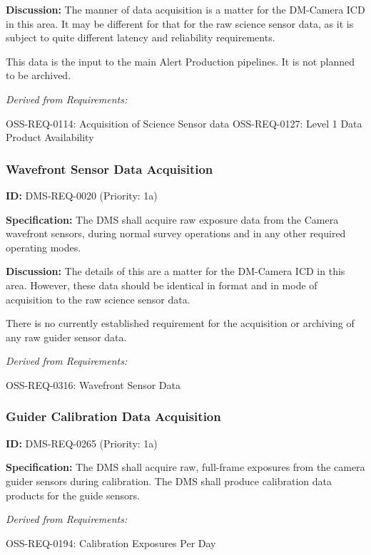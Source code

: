 \documentclass[SE,toc,lsstdraft]{lsstdoc}
\begin{document}
\textbf{Discussion:} The manner of data acquisition is a matter for the DM-Camera ICD in this area.  It may be different for that for the raw science sensor data, as it is subject to quite different latency and reliability requirements.

This data is the input to the main Alert Production pipelines.  It is not planned to be archived.

\emph{Derived from Requirements:}

OSS-REQ-0114:
Acquisition of Science Sensor data \newline
OSS-REQ-0127:
Level 1 Data Product Availability \newline

\subsubsection{Wavefront Sensor Data Acquisition}

\label{DMS-REQ-0020}
\textbf{ID:} DMS-REQ-0020 (Priority: 1a)

\textbf{Specification:} The DMS shall acquire raw exposure data from the Camera wavefront sensors, during normal survey operations and in any other required operating modes.

\textbf{Discussion:} The details of this are a matter for the DM-Camera ICD in this area. However, these data should be identical in format and in mode of acquisition to the raw science sensor data.

There is no currently established requirement for the acquisition or archiving of any raw guider sensor data.

\emph{Derived from Requirements:}

OSS-REQ-0316:
Wavefront Sensor Data \newline

\subsubsection{Guider Calibration Data Acquisition}

\label{DMS-REQ-0265}
\textbf{ID:} DMS-REQ-0265 (Priority: 1a)

\textbf{Specification:} The DMS shall acquire raw, full-frame exposures from the camera guider sensors during calibration. The DMS shall produce calibration data products for the guide sensors.

\emph{Derived from Requirements:}

OSS-REQ-0194:
Calibration Exposures Per Day \newline
\end{document}

